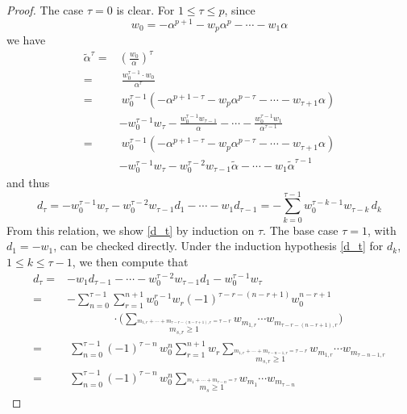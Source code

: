 \documentclass{gtpart}
\theoremstyle{definition}
\theoremstyle{remark}
\newcommand{\A}{\alpha}
\newcommand{\T}{\tau}
\renewcommand{\=}{\approx}
\renewcommand{\-}{\sim}
\numberwithin{equation}{section}
\numberwithin{thm}{section}
\begin{document}
\begin{proof}
 The case $\T = 0$ is clear.  
 For $1 \leq \T \leq p$, since 
 \[
  w_0 = -\A^{p + 1} - w_p \A^p - \cdots - w_1 \A 
 \]
 we have 
 \begin{equation*}
  \begin{split}
   \widetilde{\A}^\T = & \left( \frac{w_0}{\A} \right)^\T \\
                     = & ~ \frac{w_0^{\T - 1} \cdot w_0}{\A^\T} \\
                     = & ~ w_0^{\T - 1} (-\A^{p + 1 - \T} - w_p \A^{p - \T} - \cdots - w_{\T + 1} \A) \\
                       & - w_0^{\T - 1} w_\T - \frac{w_0^{\T - 1} w_{\T - 1}}{\A} - \cdots - \frac{w_0^{\T - 1} w_1}{\A^{\T - 1}} \\
                     = & ~ w_0^{\T - 1} (-\A^{p + 1 - \T} - w_p \A^{p - \T} - \cdots - w_{\T + 1} \A) \\
                       & - w_0^{\T - 1} w_\T - w_0^{\T - 2} w_{\T - 1} \widetilde{\A} - \cdots - w_1 \widetilde{\A}^{\T - 1} 
  \end{split}
 \end{equation*}
 and thus 
 \[
  d_\T = -w_0^{\T - 1} w_\T - w_0^{\T - 2} w_{\T - 1} d_1 - \cdots - w_1 d_{\T - 1} = -\sum_{k = 0}^{\T - 1} w_0^{\T - k - 1} w_{\T - k} \, d_k 
 \]
 From this relation, we show \eqref{d_t} by induction on $\T$.  
 The base case $\T = 1$, with $d_1 = -w_1$, can be checked directly.  
 Under the induction hypothesis \eqref{d_t} for $d_k$, $1 \leq k \leq \T - 1$, 
 we then compute that 
 \begin{equation*}
  \begin{split}
   d_\T = & -w_1 d_{\T - 1} - \cdots - w_0^{\T - 2} w_{\T - 1} d_1 - w_0^{\T - 1} w_\T \\
        = & -\sum_{n = 0}^{\T - 1} \sum_{r = 1}^{n + 1} w_0^{r - 1} w_r (-1)^{\T - r - (n - r + 1)} w_0^{n - r + 1} \\
          & \qquad\qquad \cdot \Bigg( \sum_{\stackrel{\scriptstyle m_{1,r} + \cdots + m_{\T - r - (n - r + 1),r} = \T - r}{m_{s,r} \geq 1}} w_{m_{1,r}} \cdots w_{m_{\T - r - (n - r + 1),r}} \Bigg) \\
        = & ~ \sum_{n = 0}^{\T - 1} (-1)^{\T - n} \, w_0^n \sum_{r = 1}^{n + 1} w_r 
            \sum_{\stackrel{\scriptstyle m_{1,r} + \cdots + m_{\T - n - 1,r} = \T - r}{m_{s,r} \geq 1}} w_{m_{1,r}} \cdots w_{m_{\T - n - 1,r}} \\
        = & ~ \sum_{n = 0}^{\T - 1} (-1)^{\T - n} \, w_0^n \sum_{\stackrel{\scriptstyle m_1 + \cdots + m_{\T - n} = \T}{m_s \geq 1}} w_{m_1} \cdots w_{m_{\T - n}} 
  \end{split}
 \end{equation*}
\end{proof}
\end{document}
